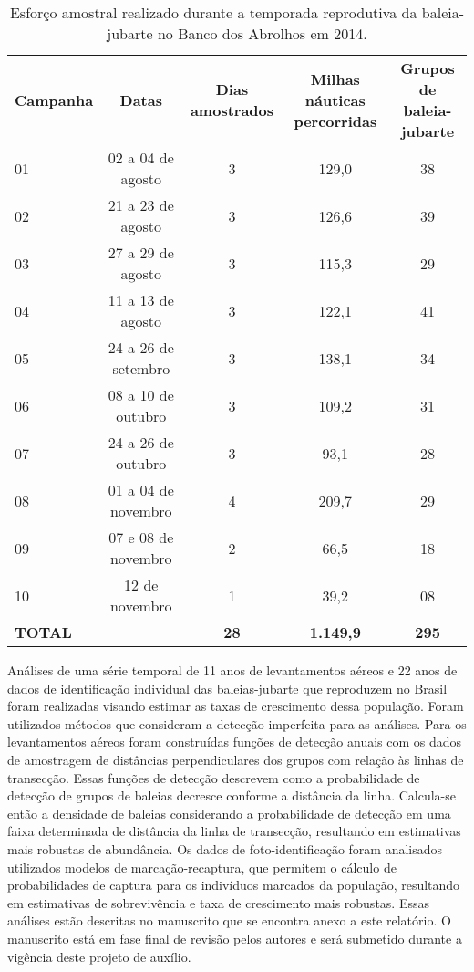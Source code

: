 \begin{table}
  \begin{tabular}{lcccc}  
    \textbf{Campanha} & \textbf{Datas} & \textbf{Dias amostrados} & \textbf{Milhas náuticas percorridas} & \textbf{Grupos de baleia-jubarte} \\
    01 & 02 a 04 de agosto & 3 & 129,0 & 38 \\
    02 & 21 a 23 de agosto & 3 & 126,6 & 39 \\
    03 & 27 a 29 de agosto & 3 & 115,3 & 29 \\
    04 & 11 a 13 de agosto & 3 & 122,1 & 41 \\
    05 & 24 a 26 de setembro & 3 & 138,1 & 34 \\
    06 & 08 a 10 de outubro & 3 & 109,2 & 31 \\
    07 & 24 a 26 de outubro & 3 & 93,1 & 28 \\
    08 & 01 a 04 de novembro & 4 & 209,7 & 29 \\
    09 & 07 e 08 de novembro & 2 & 66,5 & 18 \\
    10 & 12 de novembro & 1 & 39,2 & 08 \\
    \textbf{TOTAL} & & \textbf{28} & \textbf{1.149,9} & \textbf{295} \\
  \end{tabular}
\caption{Esforço amostral realizado durante a temporada reprodutiva da baleia-jubarte no Banco dos Abrolhos em 2014.}
\label{tab:baleia1}    
\end{table}

Análises de uma série temporal de 11 anos de levantamentos aéreos e 22
anos de dados de identificação individual das baleias-jubarte que
reproduzem no Brasil foram realizadas visando estimar as taxas de
crescimento dessa população. Foram utilizados métodos que consideram a
detecção imperfeita para as análises. Para os levantamentos aéreos
foram construídas funções de detecção anuais com os dados de
amostragem de distâncias perpendiculares dos grupos com relação às
linhas de transecção. Essas funções de detecção descrevem como a
probabilidade de detecção de grupos de baleias decresce conforme a
distância da linha. Calcula-se então a densidade de baleias
considerando a probabilidade de detecção em uma faixa determinada de
distância da linha de transecção, resultando em estimativas mais
robustas de abundância. Os dados de foto-identificação foram
analisados utilizados modelos de marcação-recaptura, que permitem o
cálculo de probabilidades de captura para os indivíduos marcados da
população, resultando em estimativas de sobrevivência e taxa de
crescimento mais robustas. Essas análises estão descritas no
manuscrito que se encontra anexo a este relatório. O manuscrito está
em fase final de revisão pelos autores e será submetido durante a
vigência deste projeto de auxílio.